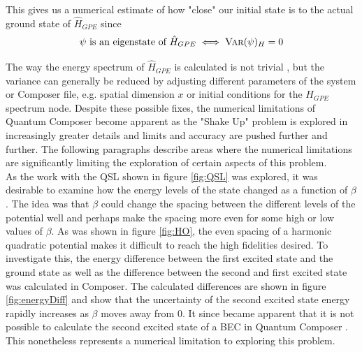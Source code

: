 \documentclass[aps,pra,reprint,superscriptaddress]{revtex4-1}
\begin{document}
This gives us a numerical estimate of how "close" our initial state is to the actual ground state of $\hat{H}_{GPE}$ since
\begin{equation}
	\psi \text{ is an eigenstate of } \hat{H}_{GPE} \iff \textsc{Var}(\psi)_H = 0
\end{equation}

The way the energy spectrum of $\hat{H}_{GPE}$ is calculated is not trivial \cite{QEngine}, but the variance can generally be reduced by adjusting different parameters of the system or Composer file, e.g. spatial dimension $x$ or initial conditions for the $H_{GPE}$ spectrum node. Despite these possible fixes, the numerical limitations of Quantum Composer become apparent as the "Shake Up" problem is explored in increasingly greater details and limits and accuracy are pushed further and further. The following paragraphs describe areas where the numerical limitations are significantly limiting the exploration of certain aspects of this problem.\\

As the work with the QSL shown in figure \ref{fig:QSL} was explored, it was desirable to examine how the energy levels of the state changed as a function of $\beta$. The idea was that $\beta$ could change the spacing between the different levels of the potential well and perhaps make the spacing more even for some high or low values of $\beta$. As was shown in figure \ref{fig:HO}, the even spacing of a harmonic quadratic potential makes it difficult to reach the high fidelities desired. To investigate this, the energy difference between the first excited state and the ground state as well as the difference between the second and first excited state was calculated in Composer. The calculated differences are shown in figure \ref{fig:energyDiff} and show that the uncertainty of the second excited state energy rapidly increases as $\beta$ moves away from $0$. It since became apparent that it is not possible to calculate the second excited state of a BEC in Quantum Composer \cite{QEngine}. This nonetheless represents a numerical limitation to exploring this problem. \\
\end{document}

